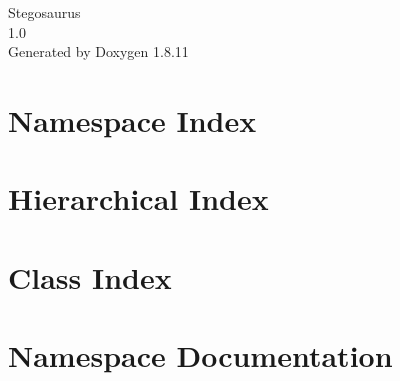 \documentclass[twoside]{book}
\newcommand{\+}{\discretionary{\mbox{\scriptsize$\hookleftarrow$}}{}{}}
\newcommand{\clearemptydoublepage}{%
  \newpage{\pagestyle{empty}\cleardoublepage}%
}
\begin{document}
\hypersetup{pageanchor=false,
             bookmarksnumbered=true,
             pdfencoding=unicode
            }
\begin{titlepage}
\vspace*{7cm}
\begin{center}%
{\Large Stegosaurus \\[1ex]\large 1.\+0 }\\
\vspace*{1cm}
{\large Generated by Doxygen 1.8.11}\\
\end{center}
\end{titlepage}
\clearemptydoublepage
\tableofcontents
\clearemptydoublepage
{}
\hypersetup{pageanchor=true}

\chapter{Namespace Index}

\chapter{Hierarchical Index}

\chapter{Class Index}

\chapter{Namespace Documentation}















\end{document}
